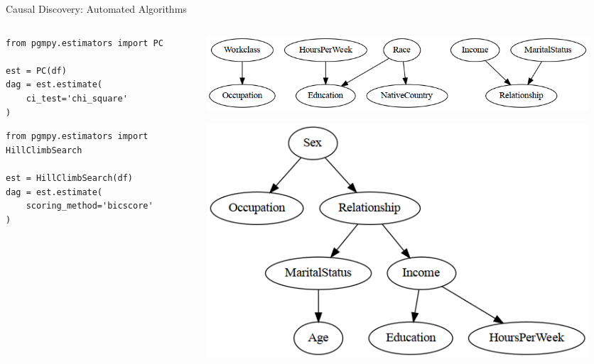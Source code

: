 \documentclass[aspectratio=169]{beamer}
\begin{document}
\begin{frame}[fragile]{Causal Discovery: Automated Algorithms}
	\begin{columns}
		\begin{column}{0.45 \textwidth}
			\begin{verbatim}
from pgmpy.estimators import PC

est = PC(df)
dag = est.estimate(
	ci_test='chi_square'
)
			\end{verbatim}
			\vspace{3em}

			\begin{verbatim}
from pgmpy.estimators import HillClimbSearch

est = HillClimbSearch(df)
dag = est.estimate(
	scoring_method='bicscore'
)
			\end{verbatim}
		\end{column}
		\begin{column}{0.55 \textwidth}
			\begin{figure}
				\includegraphics[scale=0.3]{imgs/adult_x2.png}
			\end{figure}
			\vspace{1em}
			\begin{figure}
				\includegraphics[scale=0.3]{imgs/adult_bic.png}
			\end{figure}
		\end{column}
	\end{columns}
\end{frame}
\end{document}
